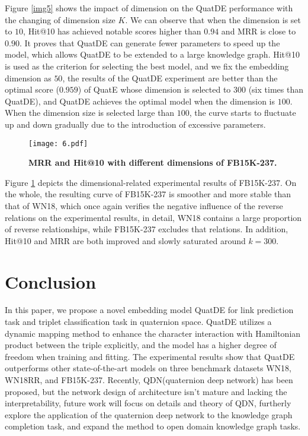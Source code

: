 \documentclass[letterpaper]{article} \usepackage{aaai20}  \usepackage{times}  \usepackage{helvet} \usepackage{courier}  \usepackage[hyphens]{url}  \usepackage{graphicx} \usepackage{lineno,hyperref,amsmath,amssymb}
\begin{document}
Figure \ref{img5} shows the impact of dimension on the QuatDE performance with the changing of dimension size $K$. We can observe that when the dimension is set to $10$, Hit@10 has achieved notable scores higher than $0.94$ and MRR is close to $0.90$. It proves that QuatDE can generate fewer parameters to speed up the model, which allows QuatDE to be extended to a large knowledge graph. Hit@10 is used as the criterion for selecting the best model, and we fix the embedding dimension as $50$, the results of the QuatDE experiment are better than the optimal score ($0.959$) of QuatE whose dimension is selected to $300$ (six times than QuatDE), and QuatDE achieves the optimal model when the dimension is $100$. When the dimension size is selected large than $100$, the curve starts to fluctuate up and down gradually due to the introduction of excessive parameters.

\begin{figure}[ht]
\centering
\texttt{[image: 6.pdf]}
\caption{\textbf{MRR and Hit@10 with different dimensions of FB15K-237.}}
\label{img6}
\end{figure}

Figure \ref{img6} depicts the dimensional-related experimental results of FB15K-237. On the whole, the resulting curve of FB15K-237 is smoother and more stable than that of WN18, which once again verifies the negative influence of the reverse relations on the experimental results, in detail, WN18 contains a large proportion of reverse relationships, while FB15K-237 excludes that relations. In addition, Hit@10 and MRR are both improved and slowly saturated around $k = 300$.

\section{Conclusion}

In this paper, we propose a novel embedding model QuatDE for link prediction task and triplet classification task in quaternion space. QuatDE utilizes a dynamic mapping method to enhance the character interaction with Hamiltonian product between the triple explicitly, and the model has a higher degree of freedom when training and fitting. The experimental results show that QuatDE outperforms other state-of-the-art models on three benchmark datasets WN18, WN18RR, and FB15K-237. Recently, QDN(quaternion deep network) has been proposed, but the network design of architecture isn’t mature and lacking the interpretability, future work will focus on details and theory of QDN, furtherly explore the application of the quaternion deep network to the knowledge graph completion task, and expand the method to open domain knowledge graph tasks.




\end{document}
